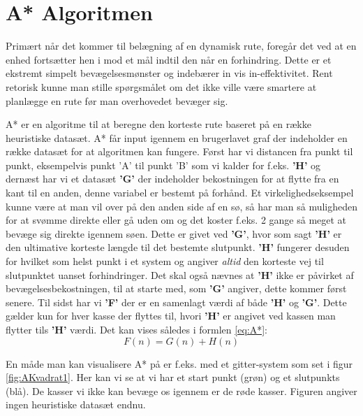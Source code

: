 \vspace{5mm}

\section{A* Algoritmen}
Primært når det kommer til belægning af en dynamisk rute, foregår det ved at en enhed fortsætter hen i mod et mål indtil den når en forhindring. Dette er et ekstremt simpelt bevægelsesmønster og indebærer in vis in-effektivitet. Rent retorisk kunne man stille spørgsmålet om det ikke ville være smartere at planlægge en rute før man overhovedet bevæger sig.

\vspace{5mm}

A* er en algoritme til at beregne den korteste rute baseret på en række heuristiske datasæt. A* får input igennem en brugerlavet graf der indeholder en række datasæt for at algoritmen kan fungere.  Først har vi distancen fra punkt til punkt, eksempelvis punkt 'A' til punkt 'B' som vi kalder for f.eks. \textbf{'H'} og dernæst har vi et datasæt \textbf{'G'} der indeholder bekostningen for at flytte fra en kant til en anden, denne variabel er bestemt på forhånd. Et virkelighedseksempel kunne være at man vil over på den anden side af en sø, så har man så muligheden for at svømme direkte eller gå uden om og det koster f.eks. 2 gange så meget at bevæge sig direkte igennem søen. Dette er givet ved \textbf{'G'}, hvor som sagt \textbf{'H'} er den ultimative korteste længde til det bestemte slutpunkt. \textbf{'H'} fungerer desuden for hvilket som helst punkt i et system og angiver \textit{altid} den korteste vej til slutpunktet uanset forhindringer. Det skal også nævnes at \textbf{'H'} ikke er påvirket af bevægelsesbekostningen, til at starte med, som \textbf{'G'} angiver, dette kommer først senere. Til sidst har vi \textbf{'F'} der er en samenlagt værdi af både \textbf{'H'} og \textbf{'G'}. Dette gælder kun for hver kasse der flyttes til, hvori \textbf{'H'} er angivet ved kassen man flytter tils \textbf{'H'} værdi. Det kan vises således i formlen \ref{eq:A*}:
\begin{equation} \label{eq:A*}
F(n) = G(n) + H(n)
\end{equation}

En måde man kan visualisere A* på er f.eks. med et gitter-system som set i figur \ref{fig:AKvadrat1}. Her kan vi se at vi har et start punkt (grøn) og et slutpunkts (blå). De kasser vi ikke kan bevæge os igennem er de røde kasser. Figuren angiver ingen heuristiske datasæt endnu.

